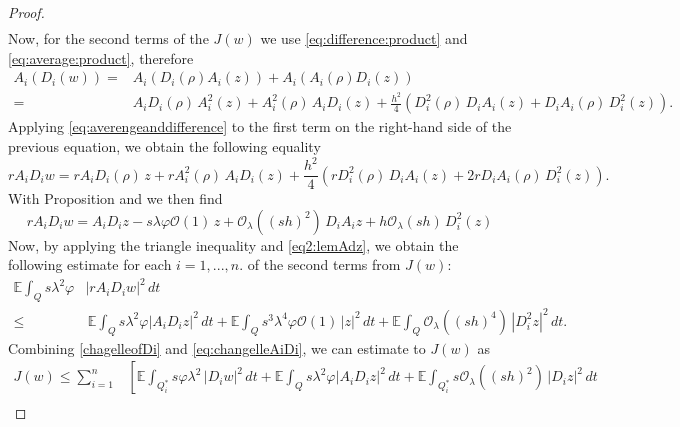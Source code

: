 \documentclass[11pt,oneside,leqno]{amsart}
\numberwithin{equation}{section}
\numberwithin{equation}{section}
\newcommand{\E}{\mathbb{E}}
\begin{document}
\begin{proof}
\begin{equation}
\begin{split}
\end{split}
\end{equation}
Now, for the second terms of the $J(w)$ we use \eqref{eq:difference:product} and \eqref{eq:average:product}, therefore
\begin{equation*}
    \begin{split}
        A_i(D_i(w))=&A_i(D_i(\rho)A_i(z))+A_i(A_i(\rho)D_i(z))\\
        =&A_iD_i(\rho)\,A_i^2(z)+A_i^2(\rho)\,A_iD_i(z)+\frac{h^2}{4}\left(D_i^2(\rho)\,D_iA_i(z)+D_iA_i(\rho)\,D_i^2(z)\right).
    \end{split}
\end{equation*}
Applying \eqref{eq:averengeanddifference} to the first term on the right-hand side of the previous equation, we obtain the following equality 
\begin{equation}\label{eq1:lemmaAD} 
    rA_iD_iw=rA_iD_i(\rho)\, z+rA_i^2(\rho)\,A_iD_i(z)+\frac{h^2}{4}\left(rD_i^2(\rho)\,D_iA_i(z)+2rD_iA_i(\rho)\,D_i^2(z)\right).
\end{equation}
With Proposition {\cite[Proposition 3.3]{AA:perez:2024}} and \cite[Lemma 3.7]{BHLR:2010b} we then find
\begin{equation}\label{eq2:lemAdz}
    rA_iD_iw=A_iD_iz-s\lambda\varphi\mathcal{O}(1)\,z+\mathcal{O}_{\lambda}((sh)^2)\,D_iA_iz+h\mathcal{O}_{\lambda}(sh)\, D_i^2(z)
\end{equation}
Now, by applying the triangle inequality and \eqref{eq2:lemAdz},   we obtain the following estimate for each $i{ =1,...,n.}$ of the second terms from $J(w)$:  
\begin{equation}\label{eq:changelleAiDi}
    \begin{split}
      \E\int_{Q}s\lambda^2\varphi &|rA_iD_iw|^2\,dt\\
      \leq& \, \E\int_{Q}s\lambda^2\varphi|A_iD_iz|^2\,dt+\E\int_{Q}s^3\lambda^4\varphi\mathcal{O}(1)\,|z|^2\,dt+\E\int_{Q}\mathcal{O}_{\lambda}((sh)^4)\,|D^2_iz|^2\,dt.
    \end{split}
\end{equation}
Combining \eqref{chagelleofDi} and \eqref{eq:changelleAiDi}, we can estimate to $J(w)$ as 
\begin{equation}\label{eq:estimateofJ(w)}
\begin{split}
    J(w)\leq \sum_{i=1}^{n}&\left[\E\int_{Q_i^{\ast}}s\varphi\lambda^2\,|D_iw|^2\,dt+\E\int_{Q}s\lambda^2\varphi|A_iD_iz|^2\,dt+\E\int_{Q_{i}^{\ast}}s\mathcal{O}_{\lambda}((sh)^2)\,|D_iz|^2\,dt\right.\\

\end{split}
\end{equation}
\end{proof}
\end{document}

